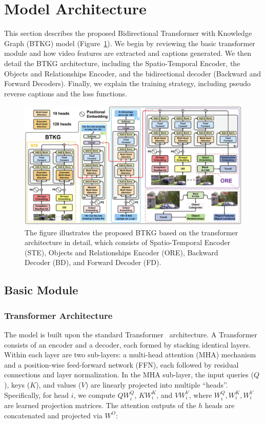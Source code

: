 \section{Model Architecture}
\label{sec:archi}

This section describes the proposed Bidirectional Transformer with Knowledge Graph (BTKG) model (Figure~\ref{fig:archi}). We begin by reviewing the basic transformer module and how video features are extracted and captions generated. We then detail the BTKG architecture, including the Spatio-Temporal Encoder, the Objects and Relationships Encoder, and the bidirectional decoder (Backward and Forward Decoders). Finally, we explain the training strategy, including pseudo reverse captions and the loss functions.

\begin{figure}[H]
    \centering
    \includegraphics[width=1\linewidth]{image/archi.jpg}
    \caption{The figure illustrates the proposed BTKG based on the transformer architecture in detail, which consists of Spatio-Temporal Encoder (STE), Objects and Relationships Encoder (ORE), Backward Decoder (BD), and Forward Decoder (FD).}
    \label{fig:archi}
\end{figure}

\subsection{Basic Module}

\subsubsection{Transformer Architecture}

The model is built upon the standard Transformer~\cite{attention_is_all_you_need} architecture. A Transformer consists of an encoder and a decoder, each formed by stacking identical layers. Within each layer are two sub-layers: a multi-head attention (MHA) mechanism and a position-wise feed-forward network (FFN), each followed by residual connections and layer normalization. In the MHA sub-layer, the input queries ($Q$), keys ($K$), and values ($V$) are linearly projected into multiple ``heads''. Specifically, for head $i$, we compute $Q W_i^Q$, $K W_i^K$, and $V W_i^V$, where $W_i^Q,W_i^K,W_i^V$ are learned projection matrices. The attention outputs of the $h$ heads are concatenated and projected via $W^O$:

